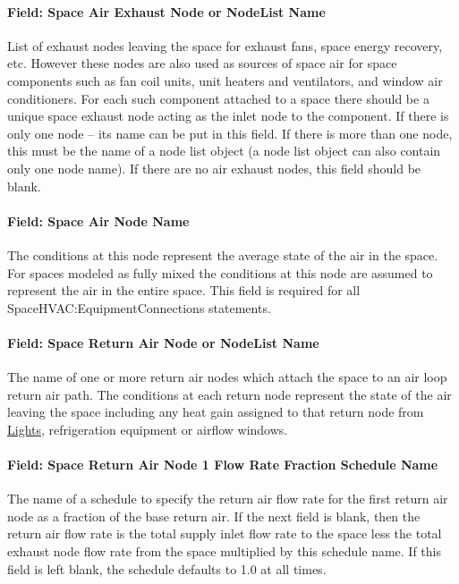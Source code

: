 \paragraph{Field: Space Air Exhaust Node or NodeList Name}\label{field-space-air-exhaust-node-or-nodelist-name}

List of exhaust nodes leaving the space for exhaust fans, space energy recovery, etc. However these nodes are also used as sources of space air for space components such as fan coil units, unit heaters and ventilators, and window air conditioners. For each such component attached to a space there should be a unique space exhaust node acting as the inlet node to the component. If there is only one node -- its name can be put in this field. If there is more than one node, this must be the name of a node list object (a node list object can also contain only one node name). If there are no air exhaust nodes, this field should be blank.

\paragraph{Field: Space Air Node Name}\label{field-space-air-node-name}

The conditions at this node represent the average state of the air in the space. For spaces modeled as fully mixed the conditions at this node are assumed to represent the air in the entire space. This field is required for all SpaceHVAC:EquipmentConnections statements.

\paragraph{Field: Space Return Air Node or NodeList Name}\label{field-space-return-air-node-or-nodelist-name}

The name of one or more return air nodes which attach the space to an air loop return air path. The conditions at each return node represent the state of the air leaving the space including any heat gain assigned to that return node from \hyperref[lights-000]{Lights}, refrigeration equipment or airflow windows.

\paragraph{Field: Space Return Air Node 1 Flow Rate Fraction Schedule Name}\label{field-space-return-air-flow-rate-fraction-schedule-name}

The name of a schedule to specify the return air flow rate for the first return air node as a fraction of the base return air. If the next field is blank, then the return air flow rate is the total supply inlet flow rate to the space less the total exhaust node flow rate from the space multiplied by this schedule name. If this field is left blank, the schedule defaults to 1.0 at all times.

